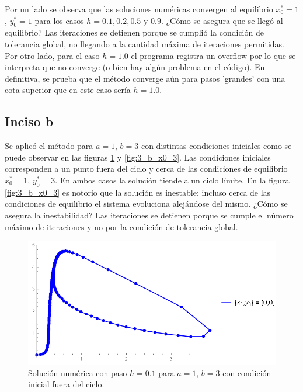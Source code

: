 \documentclass[aps,prb,twocolumn,superscriptaddress,floatfix,longbibliography]{revtex4-2}
\newcounter{para}
\begin{document}
Por un lado se observa que las soluciones numéricas convergen al equilibrio $x_0^* = 1$, $y_0^* = 1$ para los casos $h = 0.1, 0.2, 0.5$ y $0.9$. ¿Cómo se asegura que se llegó al equilibrio? Las iteraciones se detienen porque se cumplió la condición de tolerancia global, no llegando a la cantidad máxima de iteraciones permitidas. Por otro lado, para el caso $h = 1.0$ el programa registra un overflow por lo que se interpreta que no converge (o bien hay algún problema en el código). En definitiva, se prueba que el método converge aún para pasos 'grandes' con una cota superior que en este caso sería $h = 1.0$.

\subsection{Inciso b}


Se aplicó el método para $a = 1$, $b = 3$ con distintas condiciones iniciales como se puede observar en las figuras \ref{fig:3_b_x0_1} y \ref{fig:3_b_x0_3}. Las condiciones iniciales corresponden a un punto fuera del ciclo y cerca de las condiciones de equilibrio $x_0^* = 1$, $y_0^* = 3$. En ambos casos la solución tiende a un ciclo límite. En la figura \ref{fig:3_b_x0_3} es notorio que la solución es inestable: incluso cerca de las condiciones de equilibrio el sistema evoluciona alejándose del mismo. ¿Cómo se asegura la inestabilidad? Las iteraciones se detienen porque se cumple el número máximo de iteraciones y no por la condición de tolerancia global. 


\begin{figure}[h]
    \includegraphics[clip=true,width=\columnwidth]{3_b_x0_1.png}
    \caption{Solución numérica con paso $h = 0.1$ para $a = 1$, $b = 3$ con condición inicial fuera del ciclo.}
     \label{fig:3_b_x0_1}
\end{figure}
\end{document}
